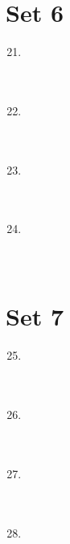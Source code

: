 \documentclass[11pt]{article}
\theoremstyle{definition}
\begin{document}
\eject

\section*{Set 6}

\begin{multicols*}{1} \begin{enumerate} 
\setcounter{enumi}{20}

\item \underline{\phantom{000000000000000}} \\ \\ \\
\item \underline{\phantom{000000000000000}} \\ \\ \\
\item \underline{\phantom{000000000000000}} \\ \\ \\
\item \underline{\phantom{000000000000000}} \\ \\ \\

\end{enumerate} \end{multicols*}

\eject

\section*{Set 7}

\begin{multicols*}{1} \begin{enumerate} 
\setcounter{enumi}{24}

\item \underline{\phantom{000000000000000}} \\ \\ \\
\item \underline{\phantom{000000000000000}} \\ \\ \\
\item \underline{\phantom{000000000000000}} \\ \\ \\
\item \underline{\phantom{000000000000000}} \\ \\ \\

\end{enumerate} \end{multicols*}
\end{document}
